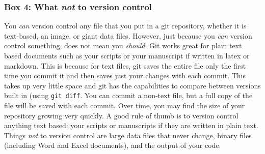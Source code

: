 \subsubsection{Box 4: What \textit{not} to version control}

You \textit{can} version control any file that you put in a git repository, whether it is text-based, an image, or giant data files. However, just because you \textit{can} version control something, does not mean you \textit{should}. Git works great for plain text based documents such as your scripts or your manuscript if written in latex or markdown. This is because for text files, git saves the entire file only the first time you commit it and then saves just your changes with each commit. This takes up very little space and git has the capabilities to compare between versions built in (using \verb|git diff|\). You can commit a non-text file, but a full copy of the file will be saved with each commit. Over time, you may find the size of your repository growing very quickly. A good rule of thumb is to version control anything text based: your scripts or manuscripts if they are written in plain text. Things \textit{not} to version control are large data files that never change, binary files (including Word and Excel documents), and the output of your code. 
